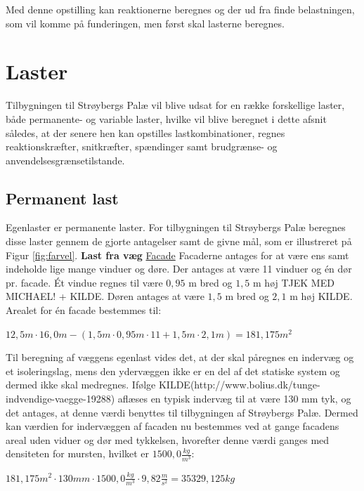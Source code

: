Med denne opstilling kan reaktionerne beregnes og der ud fra finde belastningen, som vil komme på funderingen, men først skal lasterne beregnes.

\section{Laster}
Tilbygningen til Strøybergs Palæ vil blive udsat for en række forskellige laster, både permanente- og variable laster, hvilke vil blive beregnet i dette afsnit således, at der senere hen kan opstilles lastkombinationer, regnes reaktionskræfter, snitkræfter, spændinger samt brudgrænse- og anvendelsesgrænsetilstande.

\subsection{Permanent last}
Egenlaster er permanente laster. For tilbygningen til Strøybergs Palæ beregnes disse laster gennem de gjorte antagelser samt de givne mål, som er illustreret på Figur \ref{fig:farvel}.
\newline
\newline
\textbf{Last fra væg}
\newline
\newline
\underline{Facade}
\newline
Facaderne antages for at være ens samt indeholde lige mange vinduer og døre. Der antages at være 11 vinduer og én dør pr. facade. 
\newline \indent{     }  Ét vindue regnes til være $0,\!95$ m bred og $1,\!5$ m høj TJEK MED MICHAEL! + KILDE. Døren antages at være $1,\!5$ m bred og $2,\!1$ m høj KILDE. Arealet for én facade bestemmes til:
\begin{center}
	$12,\!5 m\cdot 16,\!0 m - (1,\!5 m\cdot0,\!95 m\cdot11 + 1,\!5 m\cdot 2,\!1 m)=181,\!175 m^2$
\end{center}

Til beregning af væggens egenlast vides det, at der skal påregnes en indervæg og et isoleringslag, mens den ydervæggen ikke er en del af det statiske system og dermed ikke skal medregnes.
\newline \indent{     }  Ifølge KILDE(http://www.bolius.dk/tunge-indvendige-vaegge-19288) aflæses en typisk indervæg til at være 130 mm tyk, og det antages, at denne værdi benyttes til tilbygningen af Strøybergs Palæ. Dermed kan værdien for indervæggen af facaden nu bestemmes ved at gange facadens areal uden viduer og dør med tykkelsen, hvorefter denne værdi ganges med densiteten for mursten, hvilket er $1500,\!0 \frac{kg}{m^3}$:
\begin{center}
	$181,\!175 m^2\cdot 130 mm\cdot 1500,\!0 \frac{kg}{m^3}\cdot 9,\!82 \frac{m}{s^2}=35329,\!125 kg$
\end{center}


